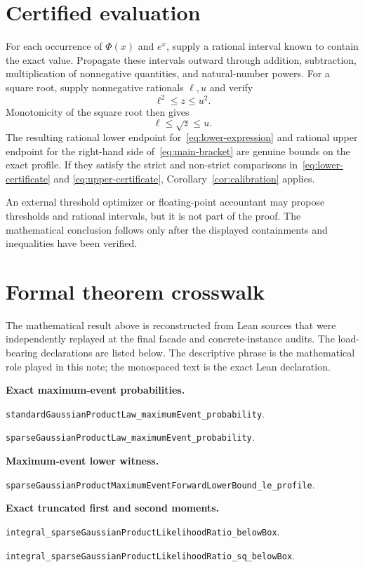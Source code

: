 \documentclass[11pt]{article}
\theoremstyle{remark}
\begin{document}
\section{Certified evaluation}\label{sec:certified-evaluation}

For each occurrence of $\Phi(x)$ and $e^x$, supply a rational interval known
to contain the exact value.  Propagate these intervals outward through
addition, subtraction, multiplication of nonnegative quantities, and
natural-number powers.  For a square root, supply nonnegative rationals
$\ell,u$ and verify
\[
  \ell^2\leq z\leq u^2.
\]
Monotonicity of the square root then gives
\[
  \ell\leq\sqrt z\leq u.
\]
The resulting rational lower endpoint for~\eqref{eq:lower-expression} and
rational upper endpoint for the right-hand side of~\eqref{eq:main-bracket}
are genuine bounds on the exact profile.  If they satisfy the strict and
non-strict comparisons in~\eqref{eq:lower-certificate} and
\eqref{eq:upper-certificate}, Corollary~\ref{cor:calibration} applies.

An external threshold optimizer or floating-point accountant may propose
thresholds and rational intervals, but it is not part of the proof.  The
mathematical conclusion follows only after the displayed containments and
inequalities have been verified.

\section{Formal theorem crosswalk}

The mathematical result above is reconstructed from Lean sources that were
independently replayed at the final facade and concrete-instance audits.
The load-bearing declarations are listed below.  The descriptive phrase is
the mathematical role played in this note; the monospaced text is the exact
Lean declaration.

\begingroup
\footnotesize
\setlength{\parskip}{0.12em}

\textbf{Exact maximum-event probabilities.}\par
\nolinkurl{standardGaussianProductLaw_maximumEvent_probability}.\par
\nolinkurl{sparseGaussianProductLaw_maximumEvent_probability}.

\textbf{Maximum-event lower witness.}\par
\nolinkurl{sparseGaussianProductMaximumEventForwardLowerBound_le_profile}.

\textbf{Exact truncated first and second moments.}\par
\nolinkurl{integral_sparseGaussianProductLikelihoodRatio_belowBox}.\par
\nolinkurl{integral_sparseGaussianProductLikelihoodRatio_sq_belowBox}.
\end{document}
